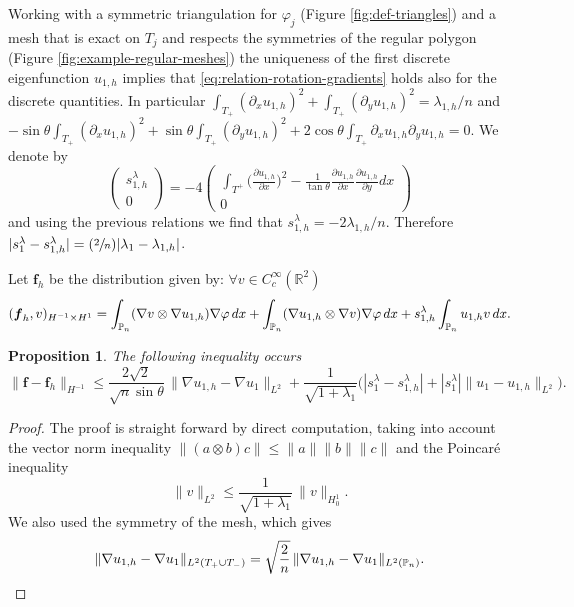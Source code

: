 \documentclass[JEP,XML,SOM,Unicode,ThmDefs,NoFloatCountersInSection,published]{cedram}
\newcommand{\Psfrac}[2]{(\sfrac{#1}{#2})}
\theoremstyle{plain}
\newtheorem{propo}[thm]{Proposition}
\theoremstyle{definition}
\newcommand{\bo}[1]{{\boldsymbol#1}}
\def\R{\mathbb{R}}
\def\Pp{{\mathbb{P}_n}}
\newcommand{\lb}{\lambda}
\begin{document}
Working with a symmetric triangulation for $\varphi_j$ (Figure \ref{fig:def-triangles}) and a mesh that is exact on $T_j$ and respects the symmetries of the regular polygon (Figure \ref{fig:example-regular-meshes}) the uniqueness of the first discrete eigenfunction $u_{1,h}$ implies that \eqref{eq:relation-rotation-gradients} holds also for the discrete quantities. In particular $\int_{T_+}(\partial_x u_{1,h})^2+\int_{T_+}(\partial_y u_{1,h})^2 = \lambda_{1,h}/n$ and $-\sin\theta \int_{T_+}(\partial_x u_{1,h})^2+\sin \theta \int_{T_+}(\partial_y u_{1,h})^2+2\cos\theta \int_{T_+}\partial_x u_{1,h}\partial_y u_{1,h} = 0$.
We denote by
\[
\begin{pmatrix}s_{1,h}^\lambda \\ 0\end{pmatrix} = -4 \begin{pmatrix} \displaystyle \int_{T^+ }\Big (\frac{\partial u_{1,h}}{\partial x} \Big)^2 - \frac{1}{\tan \theta} \frac{\partial u_{1,h} }{\partial x} \frac{\partial u_{1,h}}{\partial y}dx\\0 \end{pmatrix}
\]
and using the previous relations we find that $s_{1,h}^\lambda = -2\lambda_{1,h}/n$. Therefore $|s_1^\lambda-s_{1,h}^\lambda|=\Psfrac{2}{n}|\lambda_1-\lambda_{1,h}|$.

Let
$\bo f_h$ be the distribution given by: $\forall v \in C_c^\infty (\R^2)$
\[
(\bo f_h,v)_{H^{-1}\times H^1} = \int_{\Pp}(\nabla v \otimes \nabla u_{1,h})\nabla \varphi \notag \, dx + \int_{\Pp}(\nabla u_{1,h} \otimes \nabla v)\nabla \varphi \notag \, dx+s_{1,h}^\lambda \int_{\Pp} u_{1,h}v\, dx.
\]

\begin{propo}
The following inequality occurs
\[
\|\bo f-\bo f_h\|_{H^{-1}} \le \frac{2 \sqrt{2}}{\sqrt{n} \sin \theta }\,\|\nabla u_{1,h}-\nabla u_1\|_{L^2} + \frac{1}{\sqrt{1+\lb_1}}\Big (|s_1^\lambda- s_{1,h}^\lambda |+|s_1^\lambda| \|u_1-u_{1,h}\|_{L^2}\Big).
\]
\end{propo}

\begin{proof}
The proof is straight forward by direct computation, taking into account the vector norm inequality $\|(a\otimes b)c\|\le \|a\| \|b \| \|c\|$ and the Poincaré inequality
\[
\|v\|_{L^2} \le \frac{1}{\sqrt{1+ \lb_1}}\, \|v\|_{H^1_0}.
\]
We also used the symmetry of the mesh, which gives
\[
\|\nabla u_{1,h}-\nabla u_1\|_{L^2(T_+\cup T_-)}= \sqrt{\frac 2n}\, \|\nabla u_{1,h}-\nabla u_1\|_{L^2(\Pp)}.\qedhere
\]
\end{proof}
\end{document}
